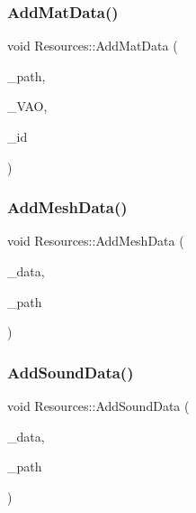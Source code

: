 \subsubsection{\texorpdfstring{Add\+Mat\+Data()}{AddMatData()}}
{\footnotesize\ttfamily void Resources\+::\+Add\+Mat\+Data (\begin{DoxyParamCaption}\item[{std\+::string}]{\+\_\+path,  }\item[{std\+::shared\+\_\+ptr$<$ \mbox{\hyperlink{class_vertex_array}{Vertex\+Array}} $>$}]{\+\_\+\+V\+AO,  }\item[{G\+Luint}]{\+\_\+id }\end{DoxyParamCaption})}

\mbox{\label{class_resources_a44d04fc717db8de2e1e402e2927f99ff}} 
\subsubsection{\texorpdfstring{Add\+Mesh\+Data()}{AddMeshData()}}
{\footnotesize\ttfamily void Resources\+::\+Add\+Mesh\+Data (\begin{DoxyParamCaption}\item[{std\+::shared\+\_\+ptr$<$ \mbox{\hyperlink{class_vertex_array}{Vertex\+Array}} $>$}]{\+\_\+data,  }\item[{std\+::string}]{\+\_\+path }\end{DoxyParamCaption})}

\mbox{\label{class_resources_a178691b808af645c7642b4bf4915ceba}} 
\subsubsection{\texorpdfstring{Add\+Sound\+Data()}{AddSoundData()}}
{\footnotesize\ttfamily void Resources\+::\+Add\+Sound\+Data (\begin{DoxyParamCaption}\item[{std\+::shared\+\_\+ptr$<$ \mbox{\hyperlink{class_vertex_array}{Vertex\+Array}} $>$}]{\+\_\+data,  }\item[{std\+::string}]{\+\_\+path }\end{DoxyParamCaption})}


